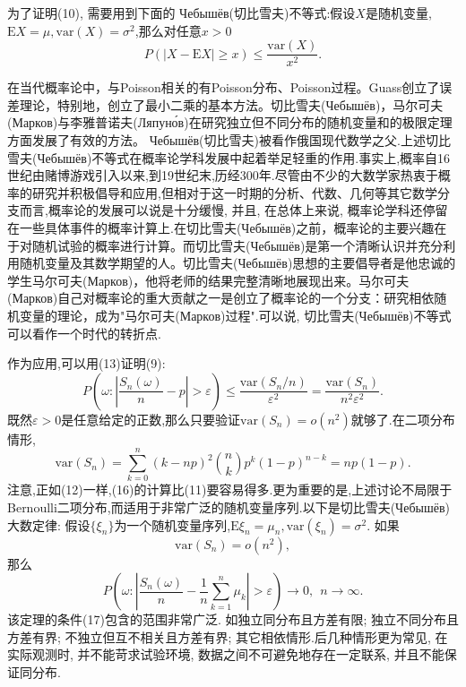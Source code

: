 \documentclass[a4paper,AutoFakeBold,oneside,12pt]{article}
\begin{document}
为了证明(10), 需要用到下面的 Чебышёв(切比雪夫)不等式:假设$X$是随机变量, $\mathrm{E}X = \mu,\mathrm{var}(X) = \sigma^2$,那么对任意$x>0$
\begin{equation}
	P(|X-\mathrm{E}X|\geqslant x)\leqslant \frac{\mathrm{var}(X)}{x^2}.
\end{equation}

 在当代概率论中，与Poisson相关的有Poisson分布、Poisson过程。Guass创立了误差理论，特别地，创立了最小二乘的基本方法。切比雪夫(Чебышёв)，马尔可夫(Марков)与李雅普诺夫(Ляпуно́в)在研究独立但不同分布的随机变量和的极限定理方面发展了有效的方法。
 Чебышёв(切比雪夫)被看作俄国现代数学之父.上述切比雪夫(Чебышёв)不等式在概率论学科发展中起着举足轻重的作用.事实上,概率自16世纪由赌博游戏引入以来,到19世纪末,历经300年.尽管由不少的大数学家热衷于概率的研究并积极倡导和应用,但相对于这一时期的分析、代数、几何等其它数学分支而言,概率论的发展可以说是十分缓慢, 并且, 在总体上来说, 概率论学科还停留在一些具体事件的概率计算上.在切比雪夫(Чебышёв)之前，概率论的主要兴趣在于对随机试验的概率进行计算。而切比雪夫(Чебышёв)是第一个清晰认识并充分利用随机变量及其数学期望的人。切比雪夫(Чебышёв)思想的主要倡导者是他忠诚的学生马尔可夫(Марков)，他将老师的结果完整清晰地展现出来。马尔可夫(Марков)自己对概率论的重大贡献之一是创立了概率论的一个分支：研究相依随机变量的理论，成为"马尔可夫(Марков)过程".可以说, 切比雪夫(Чебышёв)不等式可以看作一个时代的转折点.
 

作为应用,可以用(13)证明(9):
\begin{equation}
	P\left(\omega:\left|\frac{S_n(\omega)}{n}-p\right|>\varepsilon \right)
	\leqslant \frac{\mathrm{var}(S_n/n)}{\varepsilon^2} = \frac{\mathrm{var}(S_n)}{n^2\varepsilon^2}.
\end{equation}
既然$\varepsilon>0$是任意给定的正数,那么只要验证$\mathrm{var}(S_n) = o(n^2)$就够了.在二项分布情形,
\begin{equation}
	\mathrm{var}(S_n) = \sum_{k=0}^n(k-np)^2\binom{n}{k}p^k(1-p)^{n-k} = np(1-p).
\end{equation}
注意,正如(12)一样,(16)的计算比(11)要容易得多.更为重要的是,上述讨论不局限于Bernoulli二项分布,而适用于非常广泛的随机变量序列.以下是切比雪夫(Чебышёв)大数定律:
假设$\{\xi_n\}$为一个随机变量序列,$\mathrm{E}\xi_n = \mu_n, \mathrm{var}(\xi_n) = \sigma^2$. 如果\begin{equation}
	\mathrm{var}(S_n) = o(n^2),
\end{equation}
那么\begin{equation}
	P\left(\omega:\left|\frac{S_n(\omega)}{n}-\frac{1}{n}\sum_{k=1}^n\mu_k\right|>\varepsilon \right)\to 0,~~n\to\infty.
\end{equation}
该定理的条件(17)包含的范围非常广泛. 如独立同分布且方差有限; 独立不同分布且方差有界; 不独立但互不相关且方差有界; 其它相依情形.后几种情形更为常见, 在实际观测时, 并不能苛求试验环境, 数据之间不可避免地存在一定联系, 并且不能保证同分布.
\end{document}
